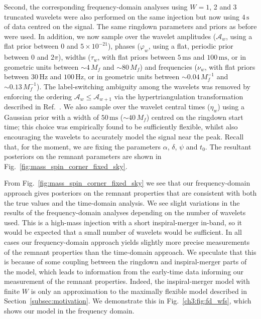 Second, the corresponding frequency-domain analyses using $W=1$, 2 and 3 truncated wavelets were also performed on the same injection but now using $4\,\mathrm{s}$ of data centred on the signal.
The same ringdown parameters and priors as before were used. 
In addition, we now sample over the wavelet amplitudes ($\mathcal{A}_w$, using a flat prior between 0 and $5 \times 10^{-21}$), phases ($\varphi_w$, using a flat, periodic prior between $0$ and $2\pi$), widths ($\tau_w$, with flat priors between $5\,\mathrm{ms}$ and $100\,\mathrm{ms}$, or in geometric units between $\sim 4\,M_f$ and $\sim 80\,M_f$) and frequencies ($\nu_w$, with flat priors between $30\,\mathrm{Hz}$ and $100\,\mathrm{Hz}$, or in geometric units between $\sim 0.04\,M_f^{-1}$ and $\sim 0.13\,M_f^{-1}$). 
The label-switching ambiguity among the wavelets was removed by enforcing the ordering $\mathcal{A}_w\leq\mathcal{A}_{w+1}$ via the hypertriangulation transformation described in Ref.~\cite{Buscicchio:2019rir}.
We also sample over the wavelet central times ($\eta_w$) using a Gaussian prior with a width of $50\,\mathrm{ms}$ ($\sim 40\,M_f$) centred on the ringdown start time; this choice was empirically found to be sufficiently flexible, whilst also encouraging the wavelets to accurately model the signal near the peak.
Recall that, for the moment, we are fixing the parameters $\alpha$, $\delta$, $\psi$ and $t_0$.
The resultant posteriors on the remnant parameters are shown in Fig.~\ref{fig:mass_spin_corner_fixed_sky}.

From Fig.~\ref{fig:mass_spin_corner_fixed_sky} we see that our frequency-domain approach gives posteriors on the remnant properties that are consistent with both the true values and the time-domain analysis.
We see slight variations in the results of the frequency-domain analyses depending on the number of wavelets used.
This is a high-mass injection with a short inspiral-merger in-band, so it would be expected that a small number of wavelets would be sufficient.
In all cases our frequency-domain approach yields slightly more precise measurements of the remnant properties than the time-domain approach.
We speculate that this is because of some coupling between the ringdown and inspiral-merger parts of the model, which leads to information from the early-time data informing our measurement of the remnant properties.
Indeed, the inspiral-merger model with finite $W$ is only an approximation to the maximally flexible model described in Section~\ref{subsec:motivation}.
We demonstrate this in Fig.~\ref{ch3:fig:fd_wfs}, which shows our model in the frequency domain.

